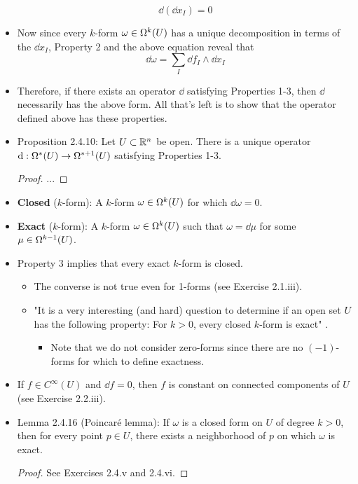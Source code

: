 \documentclass[../notes.tex]{subfiles}
\begin{document}
\begin{itemize}
    \begin{equation*}
        \dd(\dd x_I) = 0
    \end{equation*}
    \item Now since every $k$-form $\omega\in\ome[k]{U}$ has a unique decomposition in terms of the $\dd x_I$, Property 2 and the above equation reveal that
    \begin{equation*}
        \dd\omega = \sum_I\dd f_I\wedge\dd x_I
    \end{equation*}
    \item Therefore, if there exists an operator $\dd$ satisfying Properties 1-3, then $\dd$ necessarily has the above form. All that's left is to show that the operator defined above has these properties.
    \item Proposition 2.4.10: Let $U\subset\R^n$ be open. There is a unique operator $\dd:\ome[*]{U}\to\ome[*+1]{U}$ satisfying Properties 1-3.
    \begin{proof}
        ...
    \end{proof}
    \item \textbf{Closed} ($k$-form): A $k$-form $\omega\in\ome[k]{U}$ for which $\dd\omega=0$.
    \item \textbf{Exact} ($k$-form): A $k$-form $\omega\in\ome[k]{U}$ such that $\omega=\dd\mu$ for some $\mu\in\ome[k-1]{U}$.
    \item Property 3 implies that every exact $k$-form is closed.
    \begin{itemize}
        \item The converse is not true even for 1-forms (see Exercise 2.1.iii).
        \item "It is a very interesting (and hard) question to determine if an open set $U$ has the following property: For $k>0$, every closed $k$-form is exact" \parencite[49]{bib:DifferentialForms}.
        \begin{itemize}
            \item Note that we do not consider zero-forms since there are no $(-1)$-forms for which to define exactness.
        \end{itemize}
    \end{itemize}
    \item If $f\in C^\infty(U)$ and $\dd f=0$, then $f$ is constant on connected components of $U$ (see Exercise 2.2.iii).
    \item Lemma 2.4.16 (Poincar\'{e} lemma): If $\omega$ is a closed form on $U$ of degree $k>0$, then for every point $p\in U$, there exists a neighborhood of $p$ on which $\omega$ is exact.
    \begin{proof}
        See Exercises 2.4.v and 2.4.vi.
    \end{proof}
\end{itemize}
\end{document}
